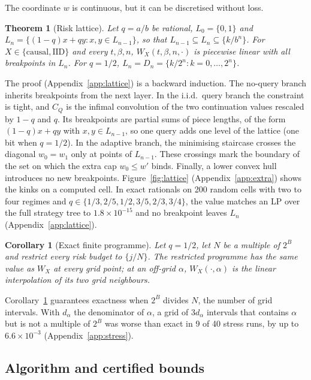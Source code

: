 \documentclass{article}
\theoremstyle{plain}
\newtheorem{theorem}{Theorem}
\newtheorem{corollary}{Corollary}
\theoremstyle{definition}
\theoremstyle{remark}
\begin{document}
The coordinate $w$ is continuous, but it can be discretised without loss.

\begin{theorem}[Risk lattice]
\label{thm:lattice}
Let $q=a/b$ be rational, $L_0=\{0,1\}$ and $L_n=\{(1-q)x+qy:x,y\in L_{n-1}\}$, so that $L_{n-1}\subseteq L_n\subseteq\{k/b^n\}$. For $X\in\{\mathrm{causal},\mathrm{IID}\}$ and every $t,\beta,n$, $W_X(t,\beta,n,\cdot)$ is piecewise linear with all breakpoints in $L_n$. For $q=1/2$, $L_n=D_n=\{k/2^n:k=0,\dots,2^n\}$.
\end{theorem}

The proof (Appendix~\ref{app:lattice}) is a backward induction. The no-query branch inherits breakpoints from the next layer. In the i.i.d.\ query branch the constraint is tight, and $C_Q$ is the infimal convolution of the two continuation values rescaled by $1-q$ and $q$. Its breakpoints are partial sums of piece lengths, of the form $(1-q)x+qy$ with $x,y\in L_{n-1}$, so one query adds one level of the lattice (one bit when $q=1/2$). In the adaptive branch, the minimising staircase crosses the diagonal $w_0=w_1$ only at points of $L_{n-1}$. These crossings mark the boundary of the set on which the extra cap $w_0\le w'$ binds. Finally, a lower convex hull introduces no new breakpoints. Figure~\ref{fig:lattice} (Appendix~\ref{app:extra}) shows the kinks on a computed cell. In exact rationals on 200 random cells with two to four regimes and $q\in\{1/3,2/5,1/2,3/5,2/3,3/4\}$, the value matches an LP over the full strategy tree to $1.8\times10^{-15}$ and no breakpoint leaves $L_n$ (Appendix~\ref{app:lattice}).


\begin{corollary}[Exact finite programme]
\label{cor:finite}
Let $q=1/2$, let $N$ be a multiple of $2^B$ and restrict every risk budget to $\{j/N\}$. The restricted programme has the same value as $W_X$ at every grid point; at an off-grid $\alpha$, $W_X(\cdot,\alpha)$ is the linear interpolation of its two grid neighbours.
\end{corollary}

Corollary~\ref{cor:finite} guarantees exactness when $2^B$ divides $N$, the number of grid intervals. With $d_\alpha$ the denominator of $\alpha$, a grid of $3d_\alpha$ intervals that contains $\alpha$ but is not a multiple of $2^B$ was worse than exact in 9 of 40 stress runs, by up to $6.6\times10^{-3}$ (Appendix~\ref{app:stress}).

\subsection{Algorithm and certified bounds}
\end{document}
